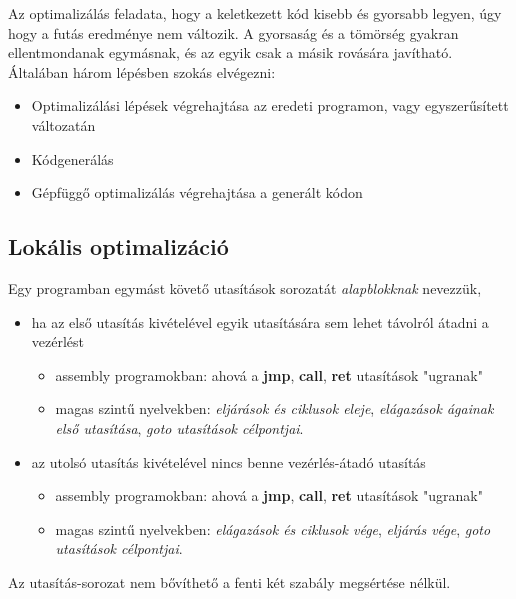 \documentclass[12pt,margin=0px]{article}
\begin{document}
    Az optimalizálás feladata, hogy a keletkezett kód kisebb és gyorsabb legyen, úgy hogy a futás eredménye nem változik. A gyorsaság és a tömörség gyakran ellentmondanak egymásnak, és az egyik csak a másik rovására javítható.\\
    
    \noindent Általában három lépésben szokás elvégezni:
	
	\begin{itemize}
		\item
		Optimalizálási lépések végrehajtása az eredeti programon, vagy egyszerűsített változatán
		\item
		Kódgenerálás
		\item
		Gépfüggő optimalizálás végrehajtása a generált kódon
	\end{itemize}
	
    \subsection*{Lokális optimalizáció}
	
    \noindent Egy programban egymást követő utasítások sorozatát \emph{alapblokknak} nevezzük,
    \begin{itemize}
        \item ha az első utasítás kivételével egyik utasítására sem lehet távolról átadni a vezérlést
        \begin{itemize}
            \item assembly programokban: ahová a \textbf{jmp}, \textbf{call}, \textbf{ret} utasítások "ugranak" 
            \item magas szintű nyelvekben: \emph{eljárások és ciklusok eleje}, \emph{elágazások ágainak első utasítása}, \emph{goto utasítások célpontjai}.
        \end{itemize}
        \item az utolsó utasítás kivételével nincs benne vezérlés-átadó utasítás 
        \begin{itemize}
            \item assembly programokban: ahová a \textbf{jmp}, \textbf{call}, \textbf{ret} utasítások "ugranak" 
            \item magas szintű nyelvekben: \emph{elágazások és ciklusok vége}, \emph{eljárás vége}, \emph{goto utasítások célpontjai}.
        \end{itemize}
    \end{itemize}
    
    \noindent Az utasítás-sorozat nem bővíthető a fenti két szabály megsértése nélkül.\\
	
\end{document}
